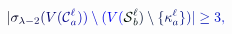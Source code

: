 \documentclass[12pt]{article}
\begin{document}
\makeatletter
\renewcommand*{\@textcolor}[3]{%
  \protect\leavevmode
  \begingroup
    \color#1{#2}#3%
  \endgroup
}
\makeatother
\begin{displaymath}
\mathcolor[RGB]{0,0,15}{|} \mathcolor[RGB]{0,0,30}{\sigma} _ { \mathcolor[RGB]{0,0,45}{\lambda} \mathcolor[RGB]{0,0,60}{-} \mathcolor[RGB]{0,0,75}{2} } \mathcolor[RGB]{0,0,90}{(} \mathcolor[RGB]{0,0,105}{V} \mathcolor[RGB]{0,0,120}{(} \mathcal { \mathcolor[RGB]{0,0,135}{C} } _ { \mathcolor[RGB]{0,0,150}{a} } ^ { \mathcolor[RGB]{0,0,165}{\ell} } \mathcolor[RGB]{0,0,180}{)} \mathcolor[RGB]{0,0,195}{)} \mathcolor[RGB]{0,0,210}{\setminus} \mathcolor[RGB]{0,0,225}{(} \mathcolor[RGB]{0,0,240}{V} \mathcolor[RGB]{0,0,255}{(} \mathcal { \mathcolor[RGB]{0,15,0}{S} } _ { \mathcolor[RGB]{0,15,15}{b} } ^ { \mathcolor[RGB]{0,15,30}{\ell} } \mathcolor[RGB]{0,15,45}{)} \mathcolor[RGB]{0,15,60}{\setminus} \mathcolor[RGB]{0,15,75}{\{} \mathcolor[RGB]{0,15,90}{\kappa} _ { \mathcolor[RGB]{0,15,105}{a} } ^ { \mathcolor[RGB]{0,15,120}{\ell} } \mathcolor[RGB]{0,15,135}{\}} \mathcolor[RGB]{0,15,150}{)} \mathcolor[RGB]{0,15,165}{|} \mathcolor[RGB]{0,15,180}{\geq} \mathcolor[RGB]{0,15,195}{3} \mathcolor[RGB]{0,15,210}{,}
\end{displaymath}
\end{document}

